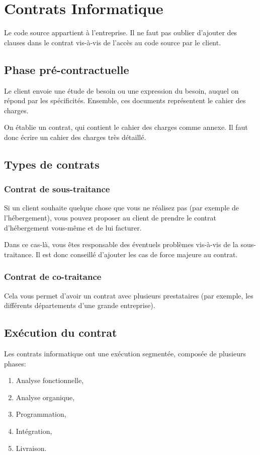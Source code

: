\documentclass[10pt,a4paper,french]{article}
\begin{document}
\section{Contrats Informatique}

Le code source appartient à l'entreprise. Il ne faut pas oublier d'ajouter des clauses dans le contrat vis-à-vis de l'accès au code source par le client.

\subsection{Phase pré-contractuelle}
Le client envoie une étude de besoin ou une expression du besoin, auquel on répond par les spécificités. Ensemble, ces documents représentent le cahier des charges.

On établie un contrat, qui contient le cahier des charges comme annexe. Il faut donc écrire un cahier des charges très détaillé.

\subsection{Types de contrats}

\subsubsection{Contrat de sous-traitance}
Si un client souhaite quelque chose que vous ne réalisez pas (par exemple de l'hébergement), vous pouvez proposer au client de prendre le contrat d'hébergement vous-même et de lui facturer.

Dans ce cas-là, vous êtes responsable des éventuels problèmes vis-à-vis de la sous-traitance. Il est donc conseillé d'ajouter les cas de force majeure au contrat.

\subsubsection{Contrat de co-traitance}
Cela vous permet d'avoir un contrat avec plusieurs prestataires (par exemple, les différents départements d'une grande entreprise).

\subsection{Exécution du contrat}
Les contrats informatique ont une exécution segmentée, composée de plusieurs phases:
\begin{enumerate}
\item Analyse fonctionnelle,
\item Analyse organique,
\item Programmation,
\item Intégration,
\item Livraison.
\end{enumerate}
\end{document}
